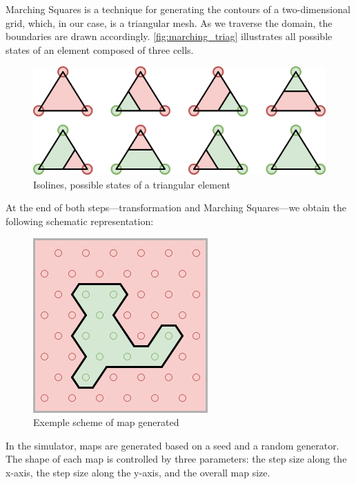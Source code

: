 \documentclass[../main.tex]{subfiles}
\begin{document}
Marching Squares is a technique for generating the contours of a two-dimensional grid, which, in our case, is a triangular mesh. As we traverse the domain, the boundaries are drawn accordingly. \autoref{fig:marching_triag} illustrates all possible states of an element composed of three cells.

\begin{figure}[H]
	\centering
	\includegraphics[width=0.6\linewidth]{IMAGES/part5/marching_square_triangle.png}
	\caption{Isolines, possible states of a triangular element}
	\label{fig:marching_triag}
\end{figure}

At the end of both steps—transformation and Marching Squares—we obtain the following schematic representation:

\begin{figure}[H]
	\centering
	\includegraphics[width=0.3\linewidth]{IMAGES/part5/map_generation_example.png}
	\caption{Exemple scheme of map generated}
	\label{fig:map_gen_scheme}
\end{figure}

In the simulator, maps are generated based on a seed and a random generator. The shape of each map is controlled by three parameters: the step size along the x-axis, the step size along the y-axis, and the overall map size.
\end{document}
